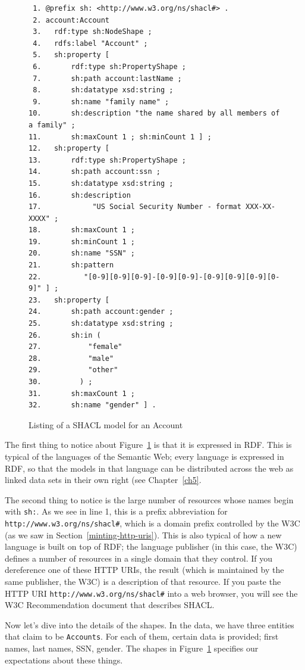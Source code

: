 \begin{figure}
  \begin{lstlisting}
 1. @prefix sh: <http://www.w3.org/ns/shacl#> .
 2. account:Account
 3.   rdf:type sh:NodeShape ;
 4.   rdfs:label "Account" ;
 5.   sh:property [
 6.       rdf:type sh:PropertyShape ;
 7.       sh:path account:lastName ;
 8.       sh:datatype xsd:string ;
 9.       sh:name "family name" ;
10.       sh:description "the name shared by all members of a family" ;
11.       sh:maxCount 1 ; sh:minCount 1 ] ;
12.   sh:property [
13.       rdf:type sh:PropertyShape ;
14.       sh:path account:ssn ;
15.       sh:datatype xsd:string ;
16.       sh:description
17.            "US Social Security Number - format XXX-XX-XXXX" ;
18.       sh:maxCount 1 ;
19.       sh:minCount 1 ;
20.       sh:name "SSN" ;
21.       sh:pattern
22.          "[0-9][0-9][0-9]-[0-9][0-9]-[0-9][0-9][0-9][0-9]" ] ;
23.   sh:property [
24.       sh:path account:gender ;
25.       sh:datatype xsd:string ;
26.       sh:in (
27.           "female"
28.           "male"
29.           "other"
30.         ) ;
31.       sh:maxCount 1 ;
32.       sh:name "gender" ] .
  \end{lstlisting}
  \caption{Listing of a SHACL model for an Account}
  \label{fig:ch7.account}
\end{figure}

The first thing to notice about Figure~\ref{fig:ch7.account} is that it is expressed in RDF.  This is typical of the languages of the Semantic Web; every language is expressed in RDF, so that the models in that language can be distributed across the web as linked data sets in their own right (see Chapter~\ref{ch5}. 

The second thing to notice is the large number of resources whose names
begin with \texttt{sh:}.  As we see in line 1, this is a prefix abbreviation for
\texttt{http://www.w3.org/ns/shacl\#}, which is a domain prefix controlled by the
W3C (as we saw in Section~\ref{minting-http-uris}).  This is also typical of how a
new language is built on top of RDF; the language publisher (in this case, the W3C)
defines a number of resources in a single domain that they control.  If you dereference
one of these HTTP URIs, the result (which is maintained by the same publisher, the W3C) is a 
description of that resource.  If you paste the HTTP URI 
\texttt{http://www.w3.org/ns/shacl\#} into a web browser, you will see the W3C 
Recommendation document that describes SHACL.


Now let's dive into the details of the shapes.  
In the data, we have three entities that claim to be \texttt{Accounts}.  For
each of them, certain data is provided; first names, last names, SSN, gender.
The shapes in Figure~\ref{fig:ch7.account} specifies our expectations about these
things.

